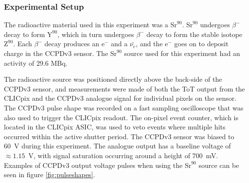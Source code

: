 
\subsubsection{Experimental Setup}
The radioactive material used in this experiment was a $\text{Sr}^{90}$.  $\text{Sr}^{90}$ undergoes $\beta^{-}$ decay to form $\text{Y}^{90}$, which in turn undergoes $\beta^{-}$ decay to form the stable isotope $\text{Z}^{90}$.  Each $\beta^{-}$ decay produces an $\text{e}^{-}$ and a $\bar{\nu_{e}}$, and the $\text{e}^{-}$ goes on to deposit charge in the CCPDv3 sensor.  The $\text{Sr}^{90}$ source used for this experiment had an activity of 29.6 MBq.  

The radioactive source was positioned directly above the back-side of the CCPDv3 sensor, and measurements were made of both the ToT output from the CLICpix and the CCPDv3 analogue signal for individual pixels on the sensor.  The CCPDv3 pulse shape was recorded on a fast sampling oscilloscope that was also used to trigger the CLICpix readout.  The on-pixel event counter, which is located in the CLICpix ASIC, was used to veto events where multiple hits occurred within the active shutter period.  The CCPDv3 sensor was biased to 60~V during this experiment.  The analogue output has a baseline voltage of $\approx 1.15$~V, with signal saturation occurring around a height of 700~mV.  Examples of CCPDv3 output voltage pulses when using the $\text{Sr}^{90}$ source can be seen in figure \ref{fig:pulseshapes}.

